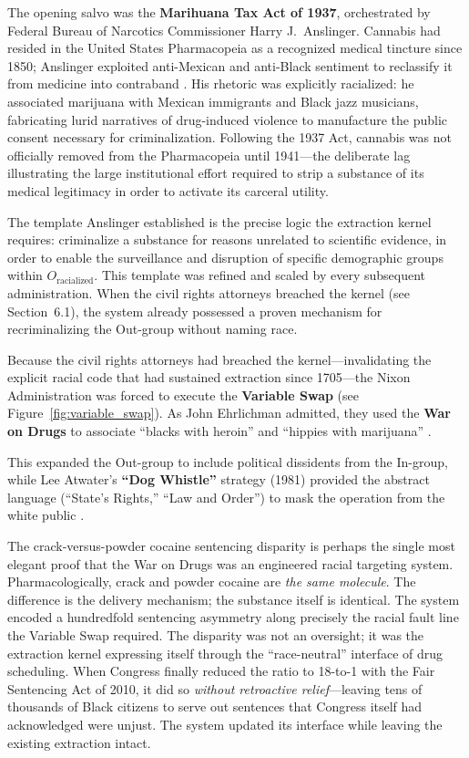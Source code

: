 The opening salvo was the \textbf{Marihuana Tax Act of 1937}, orchestrated by Federal Bureau of Narcotics Commissioner Harry J.\ Anslinger. Cannabis had resided in the United States Pharmacopeia as a recognized medical tincture since 1850; Anslinger exploited anti-Mexican and anti-Black sentiment to reclassify it from medicine into contraband \cite{bonnie}. His rhetoric was explicitly racialized: he associated marijuana with Mexican immigrants and Black jazz musicians, fabricating lurid narratives of drug-induced violence to manufacture the public consent necessary for criminalization. Following the 1937 Act, cannabis was not officially removed from the Pharmacopeia until 1941---the deliberate lag illustrating the large institutional effort required to strip a substance of its medical legitimacy in order to activate its carceral utility.

The template Anslinger established is the precise logic the extraction kernel requires: criminalize a substance for reasons unrelated to scientific evidence, in order to enable the surveillance and disruption of specific demographic groups within $O_{\text{racialized}}$. This template was refined and scaled by every subsequent administration. When the civil rights attorneys breached the kernel (see Section~6.1), the system already possessed a proven mechanism for recriminalizing the Out-group without naming race.

Because the civil rights attorneys had breached the kernel---invalidating the explicit racial code that had sustained extraction since 1705---the Nixon Administration was forced to execute the \textbf{Variable Swap} (see Figure~\ref{fig:variable_swap}). As John Ehrlichman admitted, they used the \textbf{War on Drugs} to associate ``blacks with heroin'' and ``hippies with marijuana'' \cite{baum, vera, alexander, webb}.

This expanded the Out-group to include political dissidents from the In-group, while Lee Atwater's \textbf{``Dog Whistle''} strategy (1981) provided the abstract language (``State's Rights,'' ``Law and Order'') to mask the operation from the white public \cite{lopez, phillips}.

The crack-versus-powder cocaine sentencing disparity is perhaps the single most elegant proof that the War on Drugs was an engineered racial targeting system. Pharmacologically, crack and powder cocaine are \textit{the same molecule}. The difference is the delivery mechanism; the substance itself is identical. The system encoded a hundredfold sentencing asymmetry along precisely the racial fault line the Variable Swap required. The disparity was not an oversight; it was the extraction kernel expressing itself through the ``race-neutral'' interface of drug scheduling. When Congress finally reduced the ratio to 18-to-1 with the Fair Sentencing Act of 2010, it did so \textit{without retroactive relief}---leaving tens of thousands of Black citizens to serve out sentences that Congress itself had acknowledged were unjust. The system updated its interface while leaving the existing extraction intact.

